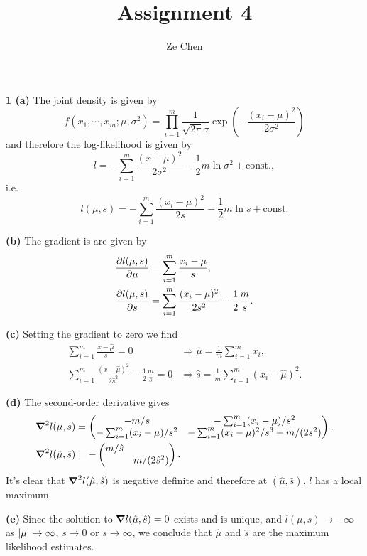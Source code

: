 \documentclass{article}
\title{Assignment 4}
\author{Ze Chen}
\makeatletter
\newcommand*{\shifttext}[1]{%
  \settowidth{\@tempdima}{#1}%
  \hspace{-\@tempdima}#1%
}
\newcommand{\plabel}[1]{%
\shifttext{\textbf{#1}\quad}%
}
\makeatother
\begin{document}
\maketitle

% 
% 

\plabel{1 (a)}%
The joint density is given by
\[ f(x_1,\cdots,x_m;\mu,\sigma^2) = \prod_{i=1}^m \frac{1}{\sqrt{2\pi}\sigma} \exp(-\frac{(x_i-\mu)^2}{2\sigma^2}) \]
and therefore the log-likelihood is given by
\[ l = -\sum_{i=1}^m \frac{(x-\mu)^2}{2\sigma^2} - \frac{1}{2} m \ln\sigma^2 + \mathrm{const}., \]
i.e.
\[ l(\mu,s) = -\sum_{i=1}^m \frac{(x_i-\mu)^2}{2s} - \frac{1}{2} m \ln s + \mathrm{const}. \]

\plabel{(b)}%
The gradient is are given by
\begin{align*}
    \pdv{l(\mu,s)}{\mu} &= \sum_{i=1}^m \frac{x_i-\mu}{s}, \\
    \pdv{l(\mu,s)}{s} &= \sum_{i=1}^m \frac{(x_i-\mu)^2}{2s^2} - \frac{1}{2} \frac{m}{s}.
\end{align*}

\plabel{(c)}%
Setting the gradient to zero we find 
\begin{align*}
    \sum_{i=1}^m \frac{x-\hat{\mu}}{s} = 0 & \Rightarrow \hat{\mu} = \frac{1}{m}\sum_{i=1}^m x_i, \\
    \sum_{i=1}^m \frac{(x-\hat{\mu})^2}{2\hat{s}^2} - \frac{1}{2} \frac{m}{\hat{s}} = 0 & \Rightarrow \hat{s} = \frac{1}{m}\sum_{i=1}^m (x_i-\hat{\mu})^2.
\end{align*}

\plabel{(d)}%
The second-order derivative gives
\begin{align*}
    \grad^2 l(\mu,s) &= \begin{pmatrix}
        -m/s & -\sum_{i=1}^m (x_i-\mu)/s^2 \\
        -\sum_{i=1}^m (x_i-\mu)/s^2 & -\sum_{i=1}^m (x_i-\mu)^2/s^3 + m/(2s^2)
    \end{pmatrix}, \\
    \grad^2 l(\hat{\mu},\hat{s}) &= -\begin{pmatrix}
        m/\hat{s} & \\
        & m/(2\hat{s}^2)
    \end{pmatrix}.
\end{align*}
It's clear that $\grad^2 l(\hat{\mu},\hat{s})$ is negative definite and therefore at $(\hat{\mu},\hat{s})$, $l$ has a local maximum.

\plabel{(e)}%
Since the solution to $\grad l(\hat{\mu},\hat{s}) = 0$ exists and is unique, and $l(\mu,s) \rightarrow -\infty$ as $\abs{\mu} \rightarrow \infty$, $s\rightarrow 0$ or $s\rightarrow \infty$, we conclude that $\hat{\mu}$ and $\hat{s}$ are the maximum likelihood estimates.
\end{document}
